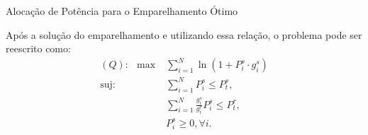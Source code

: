 %
%
\begin{frame}{Alocação de Potência para o Emparelhamento Ótimo}
   \begin{bigitem}
      \item Após a solução do emparelhamento e utilizando essa relação, o problema pode ser reescrito como:
      \begin{subequations}\label{eq:q_pro}
        \begin{alignat}{3}
             (Q):\:\: \max         & \sum_{i=1}^{N} \ln \left( 1 + P^s_i \cdot g^s_i\right)  \label{seq:main_p}  \\
             \mbox{suj} :  & \sum_{i=1}^{N} P^s_i \leq P^s_t, \label{seq:restPsS}       \\
             & \sum_{i=1}^{N} \frac{g^s_i}{g^r_i}P^s_i \leq P^r_t,  \label{seq:restPrS}     \\
             & P^s_i \geq 0, \forall i. \label{seq:restNNS}
        \end{alignat}
      \end{subequations}
   \end{bigitem}
\end{frame}

